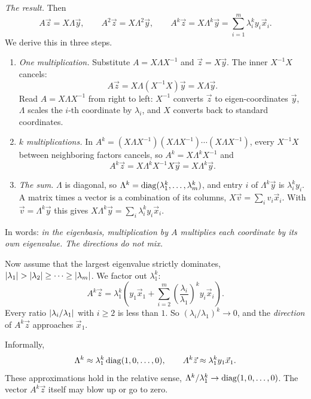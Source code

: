 \emph{The result.} Then
\begin{equation}
  A\vec{z} = X\Lambda\vec{y}, \qquad A^2\vec{z} = X\Lambda^2\vec{y}, \qquad A^k\vec{z} = X\Lambda^k\vec{y} = \sum_{i=1}^m \lambda_i^k y_i\vec{x}_i.
\end{equation}
We derive this in three steps.
\begin{enumerate}
  \item \emph{One multiplication.} Substitute $A = X\Lambda X^{-1}$ and $\vec{z} = X\vec{y}$. The inner $X^{-1}X$ cancels:
  \begin{equation*}
    A\vec{z} = X\Lambda(X^{-1}X)\vec{y} = X\Lambda\vec{y}.
  \end{equation*}
  Read $A = X\Lambda X^{-1}$ from right to left: $X^{-1}$ converts $\vec{z}$ to eigen-coordinates $\vec{y}$, $\Lambda$ scales the $i$-th coordinate by $\lambda_i$, and $X$ converts back to standard coordinates.
  \item \emph{$k$ multiplications.} In $A^k = (X\Lambda X^{-1})(X\Lambda X^{-1})\cdots(X\Lambda X^{-1})$, every $X^{-1}X$ between neighboring factors cancels, so $A^k = X\Lambda^kX^{-1}$ and
  \begin{equation*}
    A^k\vec{z} = X\Lambda^kX^{-1}X\vec{y} = X\Lambda^k\vec{y}.
  \end{equation*}
  \item \emph{The sum.} $\Lambda$ is diagonal, so $\Lambda^k = \operatorname{diag}(\lambda_1^k, \dots, \lambda_m^k)$, and entry $i$ of $\Lambda^k\vec{y}$ is $\lambda_i^ky_i$. A matrix times a vector is a combination of its columns, $X\vec{v} = \sum_i v_i\vec{x}_i$. With $\vec{v} = \Lambda^k\vec{y}$ this gives $X\Lambda^k\vec{y} = \sum_i \lambda_i^ky_i\vec{x}_i$.
\end{enumerate}
In words: \emph{in the eigenbasis, multiplication by $A$ multiplies each coordinate by its own eigenvalue. The directions do not mix.}

Now assume that the largest eigenvalue strictly dominates, $\left\lvert \lambda_1 \right\rvert > \left\lvert \lambda_2 \right\rvert \ge \cdots \ge \left\lvert \lambda_m \right\rvert$. We factor out $\lambda_1^k$:
\begin{equation}
  \label{eq:power-expand}
  A^k\vec{z} = \lambda_1^k\left(y_1\vec{x}_1 + \sum_{i=2}^m \left(\frac{\lambda_i}{\lambda_1}\right)^k y_i\vec{x}_i\right).
\end{equation}
Every ratio $\left\lvert \lambda_i/\lambda_1 \right\rvert$ with $i \ge 2$ is less than $1$. So $(\lambda_i/\lambda_1)^k \to 0$, and the \emph{direction} of $A^k\vec{z}$ approaches $\vec{x}_1$.

Informally,
\begin{equation*}
  \Lambda^k \approx \lambda_1^k\operatorname{diag}(1, 0, \dots, 0), \qquad A^k\vec{z} \approx \lambda_1^ky_1\vec{x}_1.
\end{equation*}
These approximations hold in the relative sense, $\Lambda^k/\lambda_1^k \to \operatorname{diag}(1, 0, \dots, 0)$. The vector $A^k\vec{z}$ itself may blow up or go to zero.

